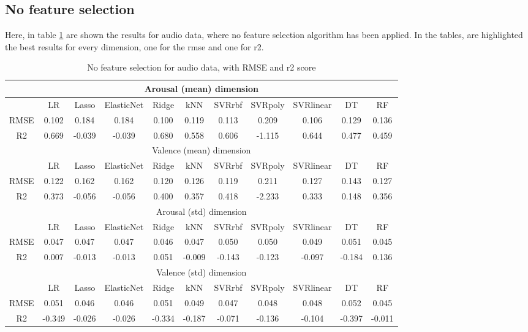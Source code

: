 \subsection{No feature selection}
Here, in table \ref{table:audio_no_fs} are shown the results for audio data, where no feature selection algorithm has been applied. In the tables, are highlighted the best results for every dimension, one for the \gls{rmse} and one for r2.
\\
\begin{table}[h!]
\begin{adjustwidth}{-3cm}{-1cm}
	\centering
	\begin{tabular}{|c|c|c|c|c|c|c|c|c|c|c|}
		\hline \multicolumn{11}{|c|}{Arousal (mean) dimension} \\
		\hline & LR & Lasso & ElasticNet & Ridge & kNN & SVRrbf & SVRpoly & SVRlinear & DT & RF \\
		\hline RMSE & 0.102 & 0.184 & 0.184 & \cellcolor{yellow}0.100 & 0.119 & 0.113 & 0.209 & 0.106 & 0.129 & 0.136 \\
		\hline R2 & \cellcolor{yellow}0.669 & -0.039 & -0.039 & 0.680 & 0.558 & 0.606 & -1.115 & 0.644 & 0.477 & 0.459 \\
		\hline \hline  \multicolumn{11}{|c|}{Valence (mean) dimension} \\
		\hline & LR & Lasso & ElasticNet & Ridge & kNN & SVRrbf & SVRpoly & SVRlinear & DT & RF \\
		\hline RMSE & 0.122 & 0.162 & 0.162 & 0.120 & 0.126 & \cellcolor{yellow}0.119 & 0.211 & 0.127 & 0.143 & 0.127 \\
		\hline R2 & 0.373 & -0.056 & -0.056 & 0.400 & 0.357 & \cellcolor{yellow}0.418 & -2.233 & 0.333 & 0.148 & 0.356 \\
		\hline \hline  \multicolumn{11}{|c|}{Arousal (std) dimension} \\
		\hline & LR & Lasso & ElasticNet & Ridge & kNN & SVRrbf & SVRpoly & SVRlinear & DT & RF \\
		\hline RMSE & 0.047 & 0.047 & 0.047 & \cellcolor{yellow}0.046 & 0.047 & 0.050 & 0.050 & 0.049 & 0.051 & 0.045 \\
		\hline R2 & 0.007 & -0.013 & -0.013 & 0.051 & -0.009 & -0.143 & -0.123 & -0.097 & -0.184 & \cellcolor{yellow}0.136 \\
		\hline \hline  \multicolumn{11}{|c|}{Valence (std) dimension} \\
		\hline & LR & Lasso & ElasticNet & Ridge & kNN & SVRrbf & SVRpoly & SVRlinear & DT & RF \\
		\hline RMSE & 0.051 & \cellcolor{yellow}0.046 & \cellcolor{yellow}0.046 & 0.051 & 0.049 & 0.047 & 0.048 & 0.048 & 0.052 & 0.045 \\
		\hline R2 & -0.349 & -0.026 & -0.026 & -0.334 & -0.187 & -0.071 & -0.136 & -0.104 & -0.397 & \cellcolor{yellow}-0.011 \\		
		\hline
	\end{tabular}
	\end{adjustwidth}
	\caption{No feature selection for audio data, with RMSE and r2 score}
	\label{table:audio_no_fs}
\end{table}
